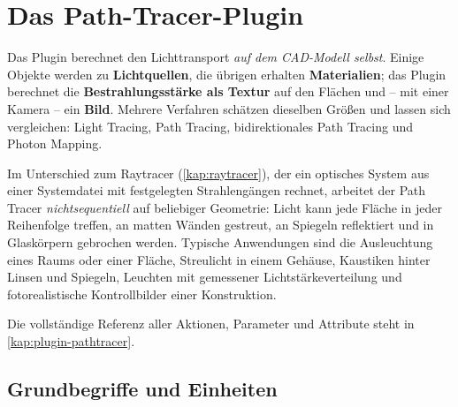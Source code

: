 \chapter{Das Path-Tracer-Plugin}\label{kap:pathtracer}

Das Plugin  berechnet den Lichttransport \emph{auf dem CAD-Modell selbst}.
Einige Objekte werden zu \textbf{Lichtquellen}, die übrigen erhalten \textbf{Materialien}; das
Plugin berechnet die \textbf{Bestrahlungsstärke als Textur} auf den Flächen und -- mit einer
Kamera -- ein \textbf{Bild}. Mehrere Verfahren schätzen dieselben Größen und lassen sich
vergleichen: Light Tracing, Path Tracing, bidirektionales Path Tracing und Photon Mapping.

Im Unterschied zum Raytracer (\autoref{kap:raytracer}), der ein optisches System aus einer
Systemdatei mit festgelegten Strahlengängen rechnet, arbeitet der Path Tracer
\emph{nichtsequentiell} auf beliebiger Geometrie: Licht kann jede Fläche in jeder Reihenfolge
treffen, an matten Wänden gestreut, an Spiegeln reflektiert und in Glaskörpern gebrochen werden.
Typische Anwendungen sind die Ausleuchtung eines Raums oder einer Fläche, Streulicht in einem
Gehäuse, Kaustiken hinter Linsen und Spiegeln, Leuchten mit gemessener Lichtstärkeverteilung und
fotorealistische Kontrollbilder einer Konstruktion.

Die vollständige Referenz aller Aktionen, Parameter und Attribute steht in
\autoref{kap:plugin-pathtracer}.

\section{Grundbegriffe und Einheiten}\label{sec:pt-grundbegriffe}

